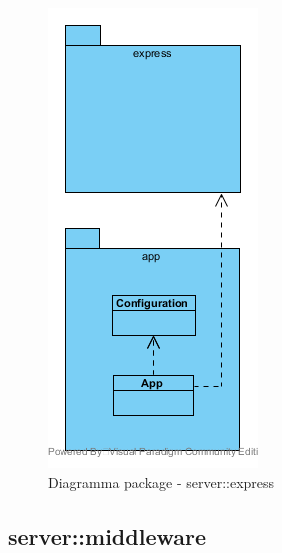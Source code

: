 \begin{center}
\begin{figure}[H]
		\centering \includegraphics[scale=4, max width=\textwidth, max height=\myheight]{../img/diagrammiClassi/server/expressApp.png}
		\caption{Diagramma package - server::express}
	\end{figure}
\end{center}\subsection{server::middleware}
